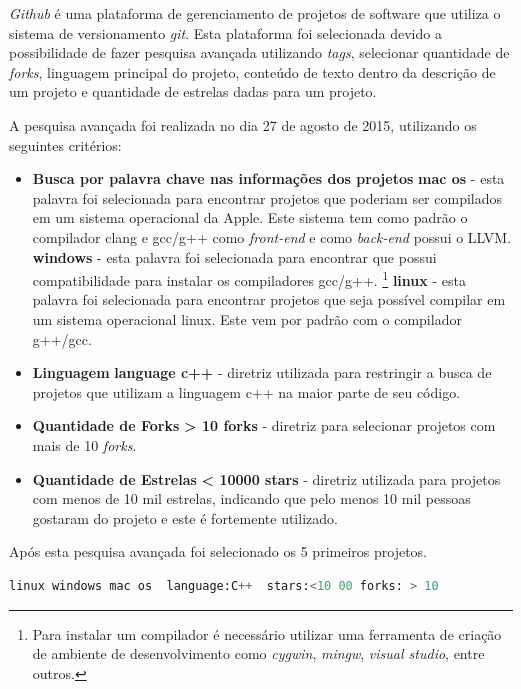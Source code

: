 \textit{Github} é uma plataforma de gerenciamento de projetos de software que
utiliza o sistema de versionamento \textit{git}. Esta plataforma foi selecionada devido a
 possibilidade de fazer pesquisa avançada utilizando \textit{tags}, selecionar quantidade de \textit{forks},
 linguagem principal do projeto, conteúdo de texto dentro da descrição de um projeto e
 quantidade de estrelas dadas para um projeto.


A pesquisa avançada foi realizada no dia 27 de agosto de 2015, utilizando os seguintes critérios:

\begin{itemize}
    \item \textbf{Busca por palavra chave nas informações dos projetos}
        \subitem \textbf{mac os} - esta palavra foi selecionada para encontrar projetos
 que poderiam ser compilados em um sistema operacional da Apple. Este sistema tem
 como padrão o compilador clang e gcc/g++ como \textit{front-end}  e como \textit{back-end} possui o LLVM.
        \subitem \textbf{windows} - esta palavra foi selecionada para encontrar 
 que possui compatibilidade para instalar os compiladores gcc/g++.
\footnote{Para instalar um compilador é necessário utilizar uma ferramenta de criação de ambiente de desenvolvimento como \textit{cygwin}, \textit{mingw}, \textit{visual studio}, entre outros.}
        \subitem \textbf{linux} - esta palavra foi selecionada para encontrar projetos
 que seja possível compilar em um sistema operacional linux. Este vem por padrão com
 o compilador g++/gcc.
    \item \textbf{Linguagem}
        \subitem \textbf{language c++} - diretriz utilizada para restringir a busca de 
projetos que utilizam a linguagem c++ na maior parte de seu código.
    \item \textbf{Quantidade de Forks}
        \subitem \textbf{ > 10 forks} - diretriz para selecionar projetos com
 mais de 10 \textit{forks}.
    \item \textbf{Quantidade de Estrelas}
        \subitem \textbf{ < 10000 stars } - diretriz utilizada para projetos com menos
 de 10 mil estrelas, indicando que pelo menos 10 mil pessoas gostaram do projeto e este
é fortemente utilizado. 
\end{itemize}

Após esta pesquisa avançada foi selecionado os 5 primeiros projetos.


\begin{lstlisting}[language=python, caption={Busca avançada github },
                  label=busca_avanacada_github]
     linux windows mac os  language:C++  stars:<10 00 forks: > 10
\end{lstlisting}



